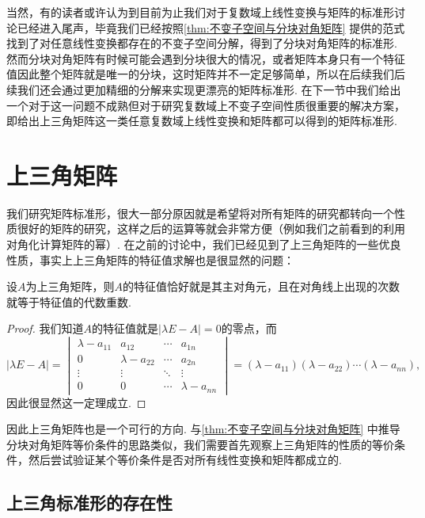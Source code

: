 当然，有的读者或许认为到目前为止我们对于复数域上线性变换与矩阵的标准形讨论已经进入尾声，毕竟我们已经按照\autoref{thm:不变子空间与分块对角矩阵} 提供的范式找到了对任意线性变换都存在的不变子空间分解，得到了分块对角矩阵的标准形. 然而分块对角矩阵有时候可能会遇到分块很大的情况，或者矩阵本身只有一个特征值因此整个矩阵就是唯一的分块，这时矩阵并不一定足够简单，所以在后续我们后续我们还会通过更加精细的分解来实现更漂亮的矩阵标准形. 在下一节中我们给出一个对于这一问题不成熟但对于研究复数域上不变子空间性质很重要的解决方案，即给出上三角矩阵这一类任意复数域上线性变换和矩阵都可以得到的矩阵标准形.

\section{上三角矩阵}

我们研究矩阵标准形，很大一部分原因就是希望将对所有矩阵的研究都转向一个性质很好的矩阵的研究，这样之后的运算等就会非常方便（例如我们之前看到的利用对角化计算矩阵的幂）. 在之前的讨论中，我们已经见到了上三角矩阵的一些优良性质，事实上上三角矩阵的特征值求解也是很显然的问题：
\begin{theorem}{}{}
    设$A$为上三角矩阵，则$A$的特征值恰好就是其主对角元，且在对角线上出现的次数就等于特征值的代数重数.
\end{theorem}
\begin{proof}
    我们知道$A$的特征值就是$|\lambda E-A|=0$的零点，而
    \[|\lambda E-A|=\begin{vmatrix}
            \lambda-a_{11} & a_{12}         & \cdots & a_{1n}         \\
            0              & \lambda-a_{22} & \cdots & a_{2n}         \\
            \vdots         & \vdots         & \ddots & \vdots         \\
            0              & 0              & \cdots & \lambda-a_{nn}
        \end{vmatrix}=(\lambda-a_{11})(\lambda-a_{22})\cdots(\lambda-a_{nn}),\]
    因此很显然这一定理成立.
\end{proof}

因此上三角矩阵也是一个可行的方向. 与\autoref{thm:不变子空间与分块对角矩阵} 中推导分块对角矩阵等价条件的思路类似，我们需要首先观察上三角矩阵的性质的等价条件，然后尝试验证某个等价条件是否对所有线性变换和矩阵都成立的.

\subsection{上三角标准形的存在性}

